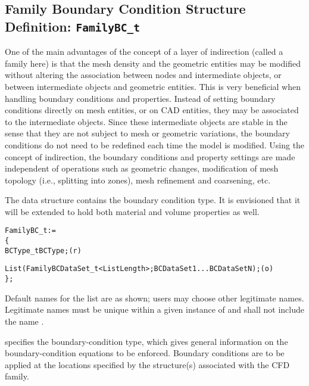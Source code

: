 \subsection{Family Boundary Condition Structure Definition: \texttt{FamilyBC\_t}}
\label{s:FamilyBC}

One of the main advantages of the concept of a layer of indirection
(called a family here) is that the mesh density and the geometric
entities may be modified without altering the association between
nodes and intermediate objects, or between intermediate objects and
geometric entities.
This is very beneficial when handling boundary conditions and properties.
Instead of setting boundary conditions directly on mesh entities,
or on CAD entities, they may be associated to the intermediate objects.
Since these intermediate objects are stable in the sense that they are
not subject to mesh or geometric variations, the boundary conditions
do not need to be redefined each time the model is modified.
Using the concept of indirection, the boundary conditions and property
settings are made independent of operations such as geometric changes,
modification of mesh topology (i.e., splitting into zones), mesh
refinement and coarsening, etc.

The  data structure contains the boundary condition type.
It is envisioned that it will be extended to hold both material and
volume properties as well.

\begin{alltt}
  FamilyBC\_t :=
    \{
    BCType\_t BCType;                                                        (r)

    List( FamilyBCDataSet\_t<ListLength>; BCDataSet1 ... BCDataSetN ) ;      (o)
    \} ;
\end{alltt}

\begin{notes}
\item Default names for the  list are as shown; users
      may choose other legitimate names.
      Legitimate names must be unique within a given instance of
       and shall not include the name .
\end{notes}

 specifies the boundary-condition type, which gives general
information on the boundary-condition equations to be enforced.
Boundary conditions are to be applied at the locations specified by the
 structure(s) associated with the CFD family.

